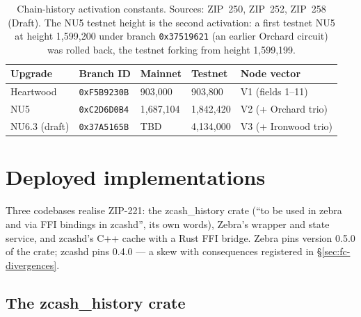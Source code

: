 \documentclass[11pt,a4paper]{article}
\theoremstyle{definition}
\begin{document}
\begin{table}[htbp]
\centering
\small
\begin{tabular}{@{}lllll@{}}
\toprule
Upgrade & Branch ID & Mainnet & Testnet & Node vector \\
\midrule
Heartwood & \texttt{0xF5B9230B} & 903{,}000 & 903{,}800 & V1 (fields
1--11) \\
NU5 & \texttt{0xC2D6D0B4} & 1{,}687{,}104 & 1{,}842{,}420 & V2 (+
Orchard trio) \\
NU6.3 (draft) & \texttt{0x37A5165B} & TBD & 4{,}134{,}000 & V3 (+
Ironwood trio) \\
\bottomrule
\end{tabular}
\caption{Chain-history activation constants. Sources: ZIP~250, ZIP~252,
ZIP~258 (Draft). The NU5 testnet height is the second activation: a
first testnet NU5 at height 1{,}599{,}200 under branch
\texttt{0x37519621} (an earlier Orchard circuit) was rolled back, the
testnet forking from height 1{,}599{,}199.}
\label{tab:fc-activations}
\end{table}


\section{Deployed implementations}\label{sec:fc-code}

Three codebases realise ZIP-221: the \textsf{zcash\_history} crate (``to
be used in zebra and via FFI bindings in zcashd'', its own words), Zebra's
wrapper and state service, and zcashd's C++ cache with a Rust FFI bridge.
Zebra pins version 0.5.0 of the crate; zcashd pins 0.4.0 --- a skew with
consequences registered in \S\ref{sec:fc-divergences}.

\subsection{The \textsf{zcash\_history} crate}\label{sec:fc-crate}
\end{document}
